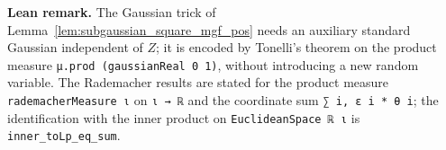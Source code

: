 \textbf{Lean remark.} The Gaussian trick of Lemma~\ref{lem:subgaussian_square_mgf_pos} needs an
auxiliary standard Gaussian independent of $Z$; it is encoded by Tonelli's theorem on the
product measure \texttt{μ.prod (gaussianReal 0 1)}, without introducing a new random variable.
The Rademacher results are stated for the product measure \texttt{rademacherMeasure ι} on
\texttt{ι → ℝ} and the coordinate sum \texttt{∑ i, ε i * θ i}; the identification with the
inner product on \texttt{EuclideanSpace ℝ ι} is \texttt{inner\_toLp\_eq\_sum}.
